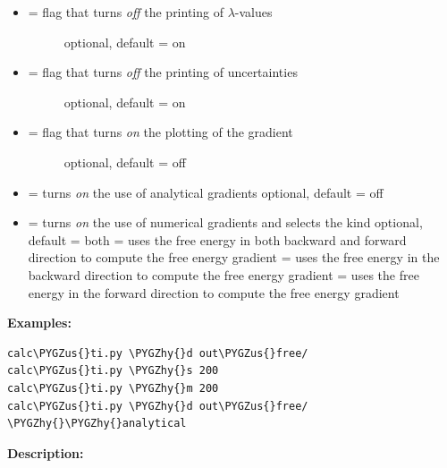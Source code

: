 \documentclass[letterpaper,10pt,english]{sphinxmanual}
\def\PYGZus{\char`\_}
\def\PYGZhy{\char`\-}
\begin{document}
\begin{itemize}
\begin{description}
\end{description}

\item {} \begin{description}
\item[{  = flag that turns \emph{off} the printing of \(\lambda\)-values}] \leavevmode
optional, default = on

\end{description}

\item {} \begin{description}
\item[{  = flag that turns \emph{off} the printing of uncertainties}] \leavevmode
optional, default = on

\end{description}

\item {} \begin{description}
\item[{  = flag that turns \emph{on} the plotting of the gradient}] \leavevmode
optional, default = off

\end{description}

\item {} 
 = turns \emph{on} the use of analytical gradients
optional, default = off

\item {} 
 = turns \emph{on} the use of numerical gradients and selects the kind
optional, default = both
 = uses the free energy in both backward and forward direction to compute the free energy gradient
 = uses the free energy in the backward direction to compute the free energy gradient
 = uses the free energy in the forward direction to compute the free energy gradient

\end{itemize}

\textbf{Examples:}

\begin{Verbatim}[frame=single,commandchars=\\\{\}]
calc\PYGZus{}ti.py \PYGZhy{}d out\PYGZus{}free/
calc\PYGZus{}ti.py \PYGZhy{}s 200
calc\PYGZus{}ti.py \PYGZhy{}m 200
calc\PYGZus{}ti.py \PYGZhy{}d out\PYGZus{}free/ \PYGZhy{}\PYGZhy{}analytical
\end{Verbatim}

\textbf{Description:}
\end{document}
